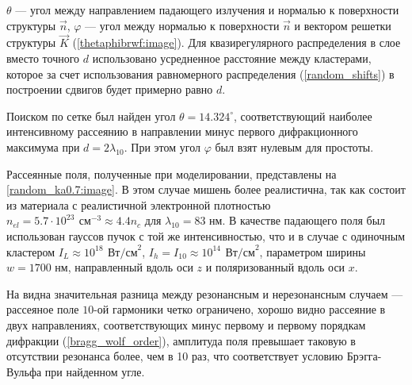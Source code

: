  $\theta$ --- угол между направлением падающего излучения и нормалью к поверхности структуры $\vec{n}$, $\varphi$ --- угол между нормалью к поверхности $\vec{n}$ и вектором решетки структуры $\vec{K}$ (\autoref{thetaphibrwf:image}). Для квазирегулярного распределения в слое вместо точного $d$ использовано усредненное расстояние между кластерами, которое за счет использования равномерного распределения (\autoref{random_shifts}) в построении сдвигов будет примерно равно $d$.


Поиском по сетке был найден угол $\theta = 14.324^{\circ}$, соответствующий наиболее интенсивному рассеянию в направлении минус первого дифракционного максимума при $d = 2\lambda_{10}$. При этом угол $\varphi$ был взят нулевым для простоты.


Рассеянные поля, полученные при моделировании, представлены на \autoref{random_ka0.7:image}. В этом случае мишень более реалистична, так как состоит из материала с реалистичной электронной плотностью $n_{el} = 5.7 \cdot 10^{23}\:\,\textrm{см}^{-3} \approx 4.4 n_{c}$ для $\lambda_{10} = 83$ нм. В качестве падающего поля был использован гауссов пучок с той же интенсивностью, что и в случае с одиночным кластером $I_{L} \approx 10^{18}\:\,\textrm{Вт/см}^2$, $I_h = I_{10} \approx 10^{14}\:\,\textrm{Вт/см}^2$, параметром ширины $w = 1700$ нм, направленный вдоль оси $z$ и поляризованный вдоль оси $x$.

На  видна значительная разница между резонансным и нерезонансным случаем --- рассеяное поле $10$-ой гармоники четко ограничено, хорошо видно рассеяние в двух направлениях, соответствующих минус первому и первому порядкам дифракции (\autoref{bragg_wolf_order}), амплитуда поля превышает таковую в отсутствии резонанса более, чем в 10 раз, что соответствует условию Брэгга-Вульфа при найденном угле.

